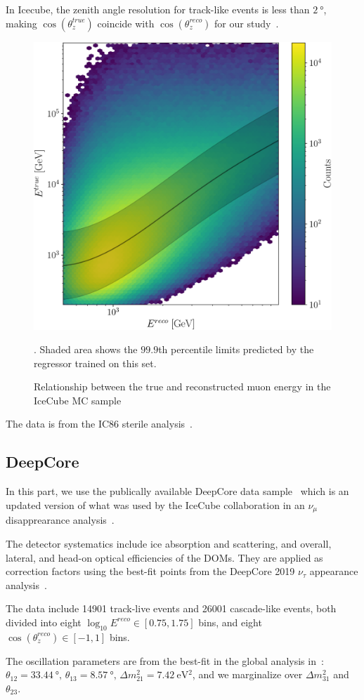\documentclass[draft=True]{revtex4-2}
\newcommand{\zreco}{\ensuremath{\cos{(\theta_z^{reco})}}}
\newcommand{\ztrue}{\ensuremath{\cos{(\theta_z^{true})}}}
\begin{document}
In Icecube, the zenith angle resolution for track-like events is less than $\SI{2}{\degree}$, making $\ztrue$ coincide with $\zreco$ for our study~\cite{IC2020}.
\begin{figure}[!tb]
    \begin{center}
       \includegraphics[width=0.4\linewidth]{figures/IC_MC_gpr.pdf}
    \end{center}
    \caption{Relationship between the true and reconstructed muon energy in the IceCube MC sample~\cite{IC2016}}\label{fig:IC_MC_counts}. Shaded area shows the $99.9$th percentile limits predicted by the regressor trained on this set.
 \end{figure}
The data is from the IC86 sterile analysis~\cite{IC2020}.

\subsection{DeepCore}\label{ch:DCmethod}
In this part, we use the publically available DeepCore data sample~\cite{DC2019data} which is an updated version of what was used by the 
IceCube collaboration in an $\nu_\mu$ disapprearance analysis~\cite{DC2018mudisappearance}.

The detector systematics include ice absorption and scattering, and overall, lateral, and head-on optical efficiencies of the DOMs. 
They are applied as correction factors using the best-fit points from the DeepCore 2019 $\nu_\tau$ appearance 
analysis~\cite{DC2019tauappearance}.

The data include 14901 track-live events and 26001 cascade-like events, both divided into eight 
$ \log_{10}E^{reco} \in [0.75,1.75]$ bins, and eight $\zreco \in [-1,1]$ bins.

The oscillation parameters are from the
best-fit in the global analysis in~\cite{nufit}: $\theta_{12} = \SI{33.44}{\degree},\, \theta_{13} = \SI{8.57}{\degree},\, \Delta m^2_{21} =  \SI{7.42}{\electronvolt^2}$, and we 
marginalize over $\Delta m^2_{31}$ and $\theta_{23}$.
\end{document}
